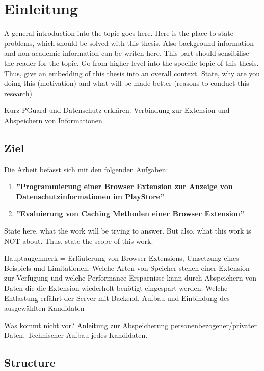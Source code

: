\chapter{Einleitung}
\label{c:introduction}

A general introduction into the topic goes here. Here is the place to state problems, which should be solved with this thesis. Also background information and non-academic information can be writen here. This part should sensibilise the reader for the topic. Go from higher level into the specific topic of this thesis. Thus, give an embedding of this thesis into an overall context. State, why are you doing this (motivation) and what will be made better (reasons to conduct this research)


Kurz PGuard und Datenschutz erklären. Verbindung zur Extension und Abspeichern von Informationen.


\section{Ziel}
\label{s:purpose}

Die Arbeit befasst sich mit den folgenden Aufgaben:
\begin{enumerate}
	\item \textbf{''Programmierung einer Browser Extension zur Anzeige von Datenschutzinformationen im PlayStore''}
	\item \textbf{''Evaluierung von Caching Methoden einer Browser Extension''}
\end{enumerate}

State here, what the work will be trying to answer. But also, what this work is NOT about. Thus, state the scope of this work.

Hauptaugenmerk = Erläuterung von Browser-Extensions, Umsetzung eines Beispiels und Limitationen.
Welche Arten von Speicher stehen einer Extension zur Verfügung und welche Performance-Ersparnisse kann durch Abspeichern von Daten die die Extension wiederholt benötigt eingespart werden. Welche Entlastung erfährt der Server mit Backend. Aufbau und Einbindung des ausgewählten Kandidaten

Was kommt nicht vor? Anleitung zur Abspeicherung personenbezogener/privater Daten. Technischer Aufbau jedes Kandidaten.

\section{Structure}
\label{s:structure}

